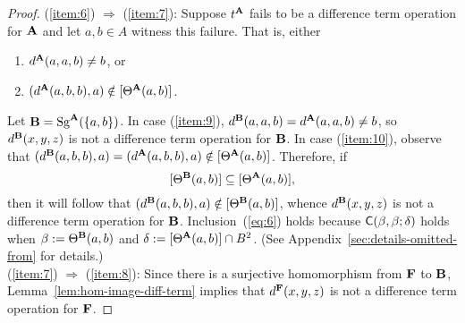 \begin{proof}
  (\ref{item:6}) $\Rightarrow $ (\ref{item:7}):
  Suppose  $t^{\mathbf{A}}$ fails to be a difference term operation for $\mathbf{A}$ and let $a, b \in
  A$ witness this failure. That is, either
  \begin{enumerate}
  \item\label{item:9} $d^{\mathbf{A}}(a,a,b) \neq b$, or
  \item\label{item:10} $(d^{\mathbf{A}}(a,b,b), a) \notin [\Theta^{\mathbf{A}} (a, b)]$.
  \end{enumerate}
  Let $\mathbf{B} = \operatorname{Sg}^{\mathbf{A}} (\{a, b\})$.  In case
  (\ref{item:9}), 
  $d^{\mathbf{B}}(a,a,b) = d^{\mathbf{A}}(a,a,b) \neq b$, so $d^{\mathbf{B}}(x,y,z)$ is not a difference
  term operation for $\mathbf{B}$.
  In case (\ref{item:10}), observe that
  $(d^{\mathbf{B}}(a,b,b), a) = (d^{\mathbf{A}}(a,b,b), a)\notin [\Theta^{\mathbf{A}} (a, b)]$.
  Therefore, if
  \begin{equation}
    \label{eq:6}
    \Com{\Cg^{\bB} (a, b)} \subseteq \Com{\Cg^{\bA} (a, b)},
  \end{equation}
  then it will follow that $(d^{\mathbf{B}}(a,b,b), a) \notin [\Theta^{\mathbf{B}} (a, b)]$,
  whence $d^{\mathbf{B}}(x,y,z)$ is not a difference term operation for $\mathbf{B}$.
  Inclusion~(\ref{eq:6}) holds because 
  $\mathsf{C}(\beta, \beta; \delta)$ holds when
  $\beta := \Theta^{\mathbf{B}} (a, b)$ and
  $\delta:=[\Theta^{\mathbf{A}} (a, b)] \cap B^2$.
  (See Appendix~\ref{sec:details-omitted-from} for details.)\\[4pt]
  (\ref{item:7}) $\Rightarrow$ (\ref{item:8}):
  Since there is a surjective homomorphism from $\mathbf{F}$ to $\mathbf{B}$,
  Lemma~\ref{lem:hom-image-diff-term} implies that $d^{\mathbf{F}}(x,y,z)$ 
  is not a difference term operation for $\mathbf{F}$.
\end{proof}

\smallskip

